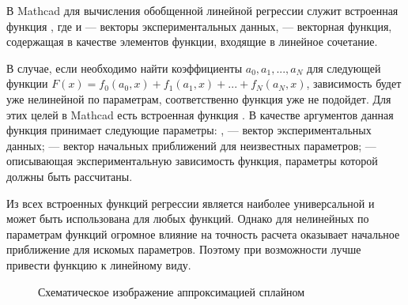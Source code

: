 В Mathcad для вычисления обобщенной линейной регрессии служит встроенная функция , где  и  --- векторы экспериментальных данных,  --- векторная функция, содержащая в качестве элементов функции, входящие в линейное сочетание.


В случае, если необходимо найти коэффициенты $a_0, a_1, ..., a_N$ для следующей функции $F(x)= f_0(a_0, x) + f_1(a_1,x) +... + f_N(a_N,x)$, зависимость будет уже нелинейной по параметрам, соответственно функция  уже не подойдет. Для этих целей в Mathcad есть встроенная функция . В качестве аргументов данная функция принимает следующие параметры: ,  --- вектор экспериментальных данных;  --- вектор начальных приближений для неизвестных параметров;
 --- описывающая экспериментальную зависимость функция, параметры которой должны быть рассчитаны.
 
\primer{}
Из всех встроенных функций регрессии  является наиболее универсальной и может быть использована для любых функций. Однако для нелинейных по параметрам функций огромное влияние на точность расчета оказывает начальное приближение   для искомых параметров. Поэтому при возможности лучше привести функцию к линейному виду.

\begin{wrapfigure}{r}{0.6\textwidth} 
	\caption{Схематическое изображение аппроксимацией сплайном}\label{fig:old.regress.spline}
\end{wrapfigure}

